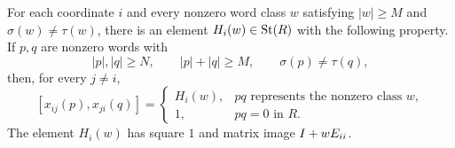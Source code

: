 \begin{lemma}\label{lem:long-commutator}
For each coordinate $i$ and every nonzero word class $w$ satisfying
$|w|\ge M$ and $\sigma(w)\ne\tau(w)$, there is an element
$H_i(w)\in\operatorname{St}(R)$ with the following property. If $p,q$ are nonzero
words with
\[
 |p|,|q|\ge N,\qquad |p|+|q|\ge M,
 \qquad \sigma(p)\ne\tau(q),
\]
then, for every $j\ne i$,
\begin{equation}\label{eq:long-opposite}
 [x_{ij}(p),x_{ji}(q)]
 =\begin{cases}
    H_i(w),& pq\text{ represents the nonzero class }w,\\
    1,& pq=0\text{ in }R.
   \end{cases}
\end{equation}
The element $H_i(w)$ has square $1$ and matrix image
$I+wE_{ii}$.
\end{lemma}

